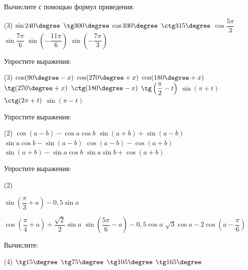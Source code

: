 \begin{consultation}
	\begin{listofex}
		\item Вычислите с помощью формул приведения:
		\begin{tasks}(3)
			\task \( \sin 240\degree \)
			\task \( \tg 300\degree \)
			\task \( \cos 330\degree \)
			\task \( \ctg 315\degree \)
			\task \( \cos \dfrac{5\pi}{3} \)
			\task \( \sin \dfrac{7\pi}{6} \)
			\task \( \sin \left( -\dfrac{11\pi}{6} \right)  \)
			\task \( \sin \left( -\dfrac{7\pi}{3} \right)  \)
		\end{tasks}
		\item Упростите выражения:
		\begin{tasks}(3)
			\task \( \cos(90\degree - x) \)
			\task \( \cos(270\degree + x) \)
			\task \( \cos(180\degree + x) \)
			\task \( \tg(270\degree + x) \)
			\task \( \ctg(180\degree - x) \)
			\task \( \tg \left( \dfrac{\pi}{2}-t \right)  \)
			\task \( \sin(\pi+t) \)
			\task \( \ctg(2\pi+t) \)
			\task \( \sin(\pi-t) \)
		\end{tasks}
		\item Упростите выражения:
		\begin{tasks}(2)
			\task \( \cos (a-b) - \cos a \cos b \)
			\task \( \sin(a+b) + \sin(a-b) \)
			\task \( \sin a \cos b - \sin(a-b) \)
			\task \( \cos(a-b)-\cos(a+b) \)
			\task \( \sin(a+b) - \sin a \cos b \)
			\task \( \sin a \sin b + \cos (a+b) \)
		\end{tasks}
		\item Упростите выражения:
		\begin{tasks}(2)
			
			\task \( \sin \left( \dfrac{\pi}{3}+a \right) -0,5\sin a \)
			
			\task \( \cos \left( \dfrac{\pi}{4}+a \right) + \dfrac{\sqrt{2}}{2}\sin a \)
			\task \( \sin \left( \dfrac{5\pi}{6}-a \right) -0,5\cos a \)
			\task \( \sqrt{3}\cos a - 2 \cos \left( a-\dfrac{\pi}{6} \right)  \)
		\end{tasks}
		\item Вычислите:
		\begin{tasks}(4)
			\task \( \tg 15 \degree \)
			\task \( \tg 75 \degree  \)
			\task \( \tg 105 \degree \)
			\task \( \tg 165 \degree \)
		\end{tasks}
	

\end{listofex}
\end{consultation}
